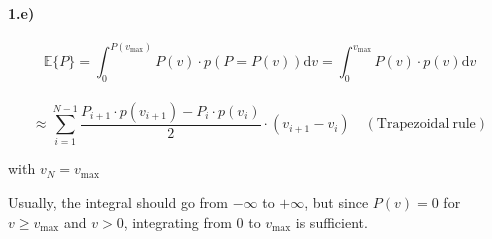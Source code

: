 \documentclass[12pt, a4paper]{scrartcl}
\begin{document}
\paragraph{1.e)}
\[\mathbb{E}\{P\}=\int_0^{P(v_\mathrm{max})} P(v)\cdot p(P=P(v))\mathrm{d}v = \int_0^{v_\mathrm{max}} P(v)\cdot p(v)\mathrm{d}v\] \\
\[\approx \sum_{i=1}^{N-1}\frac{P_{i+1}\cdot p(v_{i+1})-P_i\cdot p(v_i)}{2}\cdot (v_{i+1} - v_i)\hspace{12pt} \mathrm{(Trapezoidal\ rule)}
\]
\begin{center}
  with $v_N=v_\mathrm{max}$
\end{center}
Usually, the integral should go from $-\infty$ to $+\infty$, but since $P(v)=0$ for $v\ge v_\mathrm{max}$ and $v>0$, integrating from 0 to $v_\mathrm{max}$ is sufficient.
\end{document}
